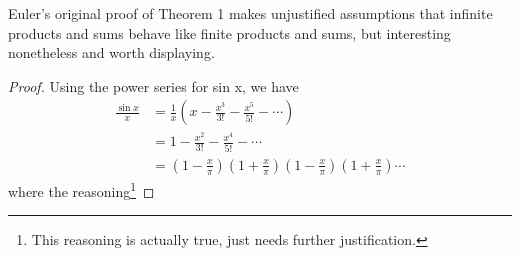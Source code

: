 \documentclass{article}
\begin{document}
Euler's original proof of Theorem 1 makes unjustified assumptions that infinite products and sums behave like finite products and sums, but interesting nonetheless and worth displaying.

\begin{proof}
Using the power series for sin x, we have
\begin{align}
    \frac{\sin x}{x} & = \frac{1}{x} \left(x-\frac{x^3}{3!}-\frac{x^5}{5!}-\cdots \right) \nonumber \\
    & = 1 - \frac{x^2}{3!} - \frac{x^4}{5!} - \cdots \nonumber \\
    & = \left(1-\frac{x}{\pi} \right) \left(1+\frac{x}{\pi} \right) \left( 1 - \frac{x}{\pi} \right) \left( 1 + \frac{x}{\pi} \right)\cdots
\end{align}
where the reasoning\footnote{This reasoning is actually true, just needs further justification.}
\end{proof}
\end{document}
